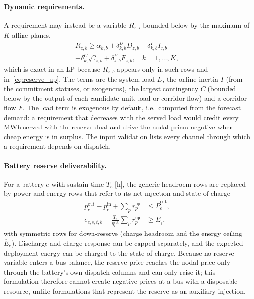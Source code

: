 \paragraph{Dynamic requirements.}
A requirement may instead be a variable $R_{z,b}$ bounded below by the
maximum of $K$ affine planes,
\begin{multline}
\label{eq:reserve_planes}
R_{z,b} \geq \alpha_{k,b} + \delta^D_{k,b} D_{z,b}
  + \delta^I_{k,b} I_{z,b} \\
  + \delta^C_{k,b} C_{z,b} + \delta^F_{k,b} F_{z,b},
  \quad k = 1,\dots,K,
\end{multline}
which is exact in an LP because $R_{z,b}$ appears only in such rows and
in~\eqref{eq:reserve_up}.  The terms are the system load $D$, the online
inertia $I$ (from the commitment statuses, or exogenous), the largest
contingency $C$ (bounded below by the output of each candidate unit,
load or corridor flow) and a corridor flow $F$.  The load term is
exogenous by default, i.e.\ computed from the forecast demand: a
requirement that decreases with the served load would credit every
MWh served with the reserve dual and drive the nodal prices negative
when cheap energy is in surplus.  The input validation lists every
channel through which a requirement depends on dispatch.

\paragraph{Battery reserve deliverability.}
For a battery $e$ with sustain time $T_e$ [h], the generic headroom
rows are replaced by power and energy rows that refer to its net
injection and state of charge,
\begin{align}
\label{eq:bess_res_power}
p^\text{out}_{e} - p^\text{in}_{e} + \textstyle\sum_{p} r^\text{up}_p
  &\leq \overline{P}^\text{out}_e, \\
\label{eq:bess_res_energy}
e_{e,s,t,b} - \tfrac{T_e}{\eta^\text{out}_e}
  \textstyle\sum_{p} r^\text{up}_p &\geq \underline{E}_e,
\end{align}
with symmetric rows for down-reserve (charge headroom and the energy
ceiling $\overline{E}_e$).  Discharge and charge response can be capped
separately, and the expected deployment energy can be charged to the
state of charge.  Because no reserve variable enters a bus balance, the
reserve price reaches the nodal price only through the battery's own
dispatch columns and can only raise it; this formulation therefore
cannot create negative prices at a bus with a disposable resource,
unlike formulations that represent the reserve as an auxiliary
injection.

